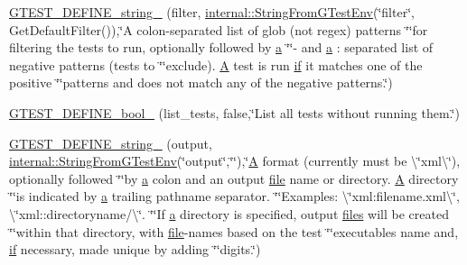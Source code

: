 \begin{DoxyCompactItemize}
\item 
\hyperlink{namespacetesting_aa7039e72c7b7041f11d2619c93a934d6}{G\+T\+E\+S\+T\+\_\+\+D\+E\+F\+I\+N\+E\+\_\+string\+\_\+} (filter, \hyperlink{namespacetesting_1_1internal_ac54dabc540bf79c2de91add679bfb93b}{internal\+::\+String\+From\+G\+Test\+Env}(\char`\"{}filter\char`\"{}, Get\+Default\+Filter()),\char`\"{}A colon-\/separated list of glob (not regex) patterns \char`\"{}\char`\"{}for filtering the tests to run, optionally followed by \hyperlink{_07copy_08_2_read_camera_model_8m_a551a3d351eadcc0b9b1a2f24f0fb5ea0}{a} \char`\"{}\char`\"{}\textquotesingle{}-\/\textquotesingle{} and \hyperlink{_07copy_08_2_read_camera_model_8m_a551a3d351eadcc0b9b1a2f24f0fb5ea0}{a} \+: separated list of negative patterns (tests to \char`\"{}\char`\"{}exclude).  \hyperlink{namespacetesting_a5e9134d655d2fc9323902348083282e7}{A} test is run \hyperlink{jquery_8js_a42cbfadee2b4749e8f699ea8d745a0e4}{if} it matches one of the positive \char`\"{}\char`\"{}patterns and does not match any of the negative patterns.\char`\"{})
\item 
\hyperlink{namespacetesting_a9ef54a5b29ac4b2a1e086e77224a0b19}{G\+T\+E\+S\+T\+\_\+\+D\+E\+F\+I\+N\+E\+\_\+bool\+\_\+} (list\+\_\+tests, false,\char`\"{}List all tests without running them.\char`\"{})
\item 
\hyperlink{namespacetesting_a9f8de43b364103bafa1e8ca4bebe9d58}{G\+T\+E\+S\+T\+\_\+\+D\+E\+F\+I\+N\+E\+\_\+string\+\_\+} (output, \hyperlink{namespacetesting_1_1internal_ac54dabc540bf79c2de91add679bfb93b}{internal\+::\+String\+From\+G\+Test\+Env}(\char`\"{}output\char`\"{},\char`\"{}\char`\"{}),\char`\"{}\hyperlink{namespacetesting_a5e9134d655d2fc9323902348083282e7}{A} format (currently must be \textbackslash{}\char`\"{}xml\textbackslash{}\char`\"{}), optionally followed \char`\"{}\char`\"{}by \hyperlink{_07copy_08_2_read_camera_model_8m_a551a3d351eadcc0b9b1a2f24f0fb5ea0}{a} colon and an output \hyperlink{_07copy_08_2_read_camera_model_8m_a151631b2fd2bb776ef06c9f440a7ed74}{file} name or directory. \hyperlink{namespacetesting_a5e9134d655d2fc9323902348083282e7}{A} directory \char`\"{}\char`\"{}is indicated by \hyperlink{_07copy_08_2_read_camera_model_8m_a551a3d351eadcc0b9b1a2f24f0fb5ea0}{a} trailing pathname separator. \char`\"{}\char`\"{}Examples\+: \textbackslash{}\char`\"{}xml\+:filename.\+xml\textbackslash{}\char`\"{}, \textbackslash{}\char`\"{}xml\+::directoryname/\textbackslash{}\char`\"{}. \char`\"{}\char`\"{}If \hyperlink{_07copy_08_2_read_camera_model_8m_a551a3d351eadcc0b9b1a2f24f0fb5ea0}{a} directory is specified, output \hyperlink{files_8js_a0742cac2750bccc2d88ac080fb9daa22}{files} will be created \char`\"{}\char`\"{}within that directory, with \hyperlink{_07copy_08_2_read_camera_model_8m_a151631b2fd2bb776ef06c9f440a7ed74}{file}-\/names based on the test \char`\"{}\char`\"{}executable\textquotesingle{}s name and, \hyperlink{jquery_8js_a42cbfadee2b4749e8f699ea8d745a0e4}{if} necessary, made unique by adding \char`\"{}\char`\"{}digits.\char`\"{})

\end{DoxyCompactItemize}

